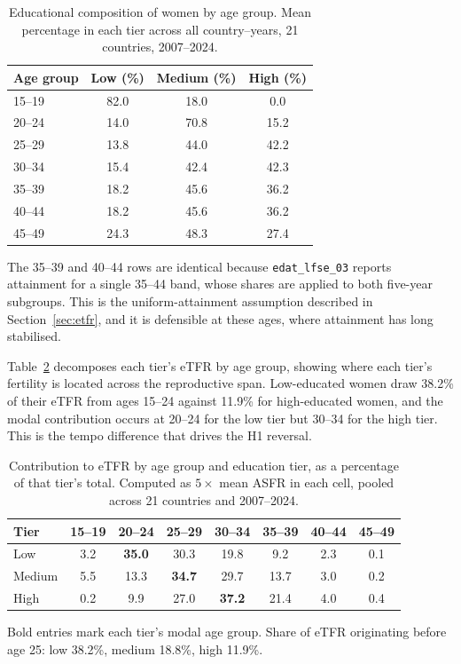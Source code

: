 \documentclass[12pt,a4paper]{report}
\begin{document}
\begin{table}[ht]
\centering
\caption{Educational composition of women by age group. Mean percentage in each tier across all country--years, 21 countries, 2007--2024.}
\label{tab:appB1}
\begin{tabular}{@{}lccc@{}}
\toprule
Age group & Low (\%) & Medium (\%) & High (\%) \\
\midrule
15--19 & 82.0 & 18.0 & 0.0 \\
20--24 & 14.0 & 70.8 & 15.2 \\
25--29 & 13.8 & 44.0 & 42.2 \\
30--34 & 15.4 & 42.4 & 42.3 \\
35--39 & 18.2 & 45.6 & 36.2 \\
40--44 & 18.2 & 45.6 & 36.2 \\
45--49 & 24.3 & 48.3 & 27.4 \\
\bottomrule
\end{tabular}

\vspace{0.5em}
\parbox{0.85\textwidth}{\footnotesize The 35--39 and 40--44 rows are identical because
\texttt{edat\_lfse\_03} reports attainment for a single 35--44 band, whose shares are applied to both
five-year subgroups. This is the uniform-attainment assumption described in
Section~\ref{sec:etfr}, and it is defensible at these ages, where attainment has long stabilised.}
\end{table}

Table~\ref{tab:appB2} decomposes each tier's eTFR by age group, showing where each tier's fertility
is located across the reproductive span. Low-educated women draw 38.2\% of their eTFR from ages
15--24 against 11.9\% for high-educated women, and the modal contribution occurs at 20--24 for the
low tier but 30--34 for the high tier. This is the tempo difference that drives the H1 reversal.

\begin{table}[ht]
\centering
\caption{Contribution to eTFR by age group and education tier, as a percentage of that tier's total. Computed as $5\times$ mean ASFR in each cell, pooled across 21 countries and 2007--2024.}
\label{tab:appB2}
\begin{tabular}{@{}lccccccc@{}}
\toprule
Tier & 15--19 & 20--24 & 25--29 & 30--34 & 35--39 & 40--44 & 45--49 \\
\midrule
Low    & 3.2 & \textbf{35.0} & 30.3 & 19.8 & 9.2  & 2.3 & 0.1 \\
Medium & 5.5 & 13.3 & \textbf{34.7} & 29.7 & 13.7 & 3.0 & 0.2 \\
High   & 0.2 & 9.9  & 27.0 & \textbf{37.2} & 21.4 & 4.0 & 0.4 \\
\bottomrule
\end{tabular}

\vspace{0.5em}
\parbox{0.85\textwidth}{\footnotesize Bold entries mark each tier's modal age group. Share of eTFR
originating before age 25: low 38.2\%, medium 18.8\%, high 11.9\%.}
\end{table}
\end{document}
